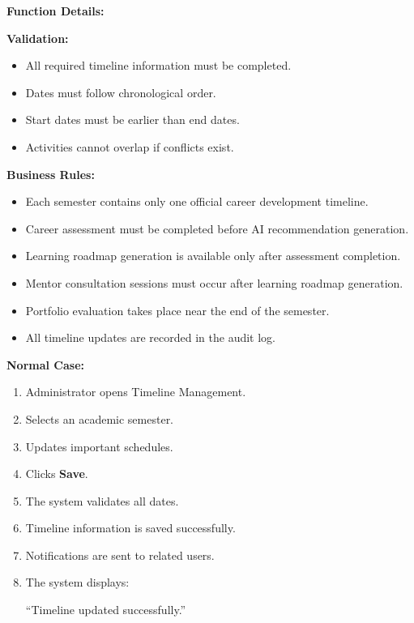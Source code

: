 \vspace{0.3cm}

\textbf{Function Details:}

\textbf{Validation:}

\begin{itemize}
    \item All required timeline information must be completed.
    \item Dates must follow chronological order.
    \item Start dates must be earlier than end dates.
    \item Activities cannot overlap if conflicts exist.
\end{itemize}

\vspace{0.2cm}

\textbf{Business Rules:}

\begin{itemize}
    \item Each semester contains only one official career development timeline.
    \item Career assessment must be completed before AI recommendation generation.
    \item Learning roadmap generation is available only after assessment completion.
    \item Mentor consultation sessions must occur after learning roadmap generation.
    \item Portfolio evaluation takes place near the end of the semester.
    \item All timeline updates are recorded in the audit log.
\end{itemize}

\vspace{0.2cm}

\textbf{Normal Case:}

\begin{enumerate}
    \item Administrator opens Timeline Management.
    \item Selects an academic semester.
    \item Updates important schedules.
    \item Clicks \textbf{Save}.
    \item The system validates all dates.
    \item Timeline information is saved successfully.
    \item Notifications are sent to related users.
    \item The system displays:

    ``Timeline updated successfully.''
\end{enumerate}

